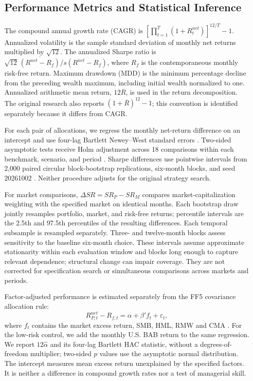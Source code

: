 \documentclass[letterpaper,journal]{IEEEtran}
\begin{document}
\subsection{Performance Metrics and Statistical Inference}
The compound annual growth rate (CAGR) is $[\prod_{t=1}^T(1+R_t^{net})]^{12/T}-1$. Annualized volatility is the sample standard deviation of monthly net returns multiplied by $\sqrt{12}$. The annualized Sharpe ratio is $\sqrt{12}\,\overline{(R^{net}-R_f)}/s(R^{net}-R_f)$, where $R_f$ is the contemporaneous monthly risk-free return. Maximum drawdown (MDD) is the minimum percentage decline from the preceding wealth maximum, including initial wealth normalized to one. Annualized arithmetic mean return, $12\overline R$, is used in the return decomposition. The original research also reports $(1+\overline R)^{12}-1$; this convention is identified separately because it differs from CAGR.

For each pair of allocations, we regress the monthly net-return difference on an intercept and use four-lag Bartlett Newey--West standard errors \cite{nw}. Two-sided asymptotic tests receive Holm adjustment across 18 comparisons within each benchmark, scenario, and period \cite{holm}. Sharpe differences use pointwise intervals from 2,000 paired circular block-bootstrap replications, six-month blocks, and seed 20261002 \cite{circularbootstrap}. Neither procedure adjusts for the original strategy search.

For market comparisons, $\Delta SR=SR_P-SR_M$ compares market-capitalization weighting with the specified market on identical months. Each bootstrap draw jointly resamples portfolio, market, and risk-free returns; percentile intervals are the 2.5th and 97.5th percentiles of the resulting differences. Each temporal subsample is resampled separately. Three- and twelve-month blocks assess sensitivity to the baseline six-month choice. These intervals assume approximate stationarity within each evaluation window and blocks long enough to capture relevant dependence; structural change can impair coverage. They are not corrected for specification search or simultaneous comparisons across markets and periods.

Factor-adjusted performance is estimated separately from the FF5 covariance allocation rule:
\begin{equation}\label{eq:ff5alpha}
 R_{P,t}^{net}-R_{f,t}=\alpha+\beta'f_t+\varepsilon_t,
\end{equation}
where $f_t$ contains the market excess return, SMB, HML, RMW and CMA \cite{ff5}. For the low-risk control, we add the monthly U.S. BAB return to the same regression. We report $12\widehat\alpha$ and its four-lag Bartlett HAC statistic, without a degrees-of-freedom multiplier; two-sided $p$ values use the asymptotic normal distribution. The intercept measures mean excess return unexplained by the specified factors. It is neither a difference in compound growth rates nor a test of managerial skill.
\end{document}
